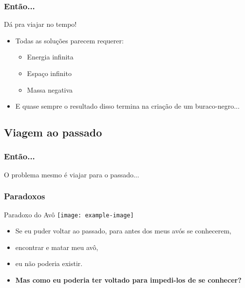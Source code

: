 \begin{frame}
    \frametitle{Então...}

    \alert{Dá pra viajar no tempo!} 

    \begin{itemize}[<3->]
        \item Todas as soluções parecem requerer:
        \begin{itemize}
            \item Energia infinita
            \item Espaço infinito
            \item Massa negativa
        \end{itemize}
        \item<4-> E quase sempre o resultado disso termina na criação de um buraco-negro...
    \end{itemize}
\end{frame}

\subsection{Viagem ao passado}

\begin{frame}
    \frametitle{Então...}

    O problema mesmo é \alert{viajar para o passado...}
\end{frame}

\begin{frame}
    \frametitle{Paradoxos}
    
    \begin{block}{Paradoxo do Avô}
        \centering
        \texttt{[image: example-image]}
    \end{block}

    \begin{itemize}
        \item<2-> Se eu puder voltar ao passado, para antes dos meus avós se conhecerem,
        \item<3-> encontrar e matar meu avô,
        \item<4-> eu não poderia existir.
        \item<5-> {\bfseries Mas como eu poderia ter voltado para impedi-los de se conhecer?} 
    \end{itemize}
    
    
\end{frame}

